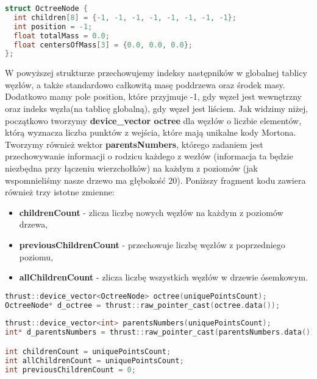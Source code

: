 \documentclass[14pt,twoside,a4paper]{article}
\theoremstyle{definition}
\begin{document}
\begin{lstlisting}[language=C++, frame=single, framerule=2pt, caption=Struktura OctreeNode]
struct OctreeNode {
  int children[8] = {-1, -1, -1, -1, -1, -1, -1, -1};
  int position = -1;
  float totalMass = 0.0;
  float centersOfMass[3] = {0.0, 0.0, 0.0};
};
\end{lstlisting}
W powyższej strukturze przechowujemy indeksy następników w globalnej tablicy węzłów, a także standardowo całkowitą masę poddrzewa oraz środek masy. Dodatkowo mamy pole position, które przyjmuje -1, gdy węzeł jest wewnętrzny oraz indeks węzła(na tablicę globalną), gdy węzeł jest liściem.
Jak widzimy niżej, początkowo tworzymy \textbf{device\_vector octree} dla węzłów o liczbie elementów, którą wyznacza liczba punktów z wejścia, które mają unikalne kody Mortona. \\
Tworzymy również wektor \textbf{parentsNumbers}, którego zadaniem jest przechowywanie informacji o rodzicu każdego z wezłów (informacja ta będzie niezbędna przy łączeniu wierzchołków) na każdym z poziomów (jak wspomnieliśmy nasze drzewo ma głębokość 20). Poniższy fragment kodu zawiera również trzy istotne zmienne:
\begin{itemize}
\item \textbf{childrenCount} - zlicza liczbę nowych węzłów na każdym z poziomów drzewa,
\item \textbf{previousChildrenCount} - przechowuje liczbę węzłów z poprzedniego poziomu,
\item \textbf{allChildrenCount} - zlicza liczbę wszystkich węzłów w drzewie ósemkowym.
\end{itemize}

\begin{lstlisting}[language=C++, frame=single, framerule=2pt, caption=Przechowywanie węzłów drzewa]
thrust::device_vector<OctreeNode> octree(uniquePointsCount);
OctreeNode* d_octree = thrust::raw_pointer_cast(octree.data());
	
thrust::device_vector<int> parentsNumbers(uniquePointsCount);
int* d_parentsNumbers = thrust::raw_pointer_cast(parentsNumbers.data());

int childrenCount = uniquePointsCount;
int allChildrenCount = uniquePointsCount;
int previousChildrenCount = 0;
\end{lstlisting}
\end{document}
